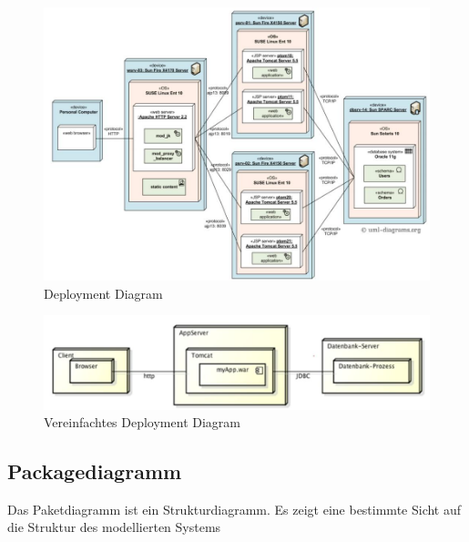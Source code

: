 \begin{figure}[h]
	\centering
	\includegraphics[width=0.6\linewidth]{images/deployment_diagram}
	\caption{Deployment Diagram}
	\label{fig:deploymentdiagram}
\end{figure}

\begin{figure}[h]
	\centering
	\includegraphics[width=0.6\linewidth]{images/deployment_diagram_simple}
	\caption{Vereinfachtes Deployment Diagram}
	\label{fig:deploymentdiagramsimple}
\end{figure}

\clearpage

\subsection{Packagediagramm}
Das Paketdiagramm ist ein Strukturdiagramm. Es zeigt eine bestimmte Sicht auf die Struktur des modellierten Systems

